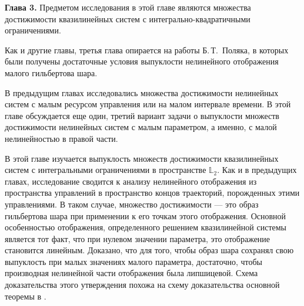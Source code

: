 \documentclass[../main.tex]{subfiles}
\begin{document}
\textbf{Глава 3. }
Предметом исследования в этой главе являются множества достижимости квазилинейных систем с интегрально-квадратичными ограничениями.

Как и другие главы, третья глава опирается на работы Б.\,Т.~Поляка\cite{Polyak2001}, в которых были получены достаточные условия выпуклости нелинейного отображения малого гильбертова шара.

В предыдущим главах исследовались множества достижимости нелинейных систем  с малым ресурсом управления или на малом интервале времени.
В этой главе обсуждается еще один, третий вариант задачи о выпуклости множеств достижимости нелинейных систем с малым параметром, а именно, с малой нелинейностью в правой части. 

В этой главе изучается выпуклость множеств достижимости квазилинейных систем с интегральными ограничениями в пространстве $\mathbb{L}_2$. 
Как и в предыдущих главах,  исследование сводится к анализу нелинейного отображения из пространства управлений в пространство концов траекторий, порожденных этими управлениями.
В таком случае, множество достижимости --- это образ гильбертова шара при применении к его точкам этого отображения. 
Основной особенностью отображения, определенного решением квазилинейной системы является тот факт, что при нулевом значении параметра, это отображение становится линейным.
Доказано, что для того, чтобы образ шара сохранял свою выпуклость при малых значениях малого параметра, достаточно, чтобы производная нелинейной части отображения была липшицевой. 
Схема доказательства этого утверждения похожа на схему доказательства основной теоремы в \cite{Polyak2001}.
\pagebreak
\end{document}
